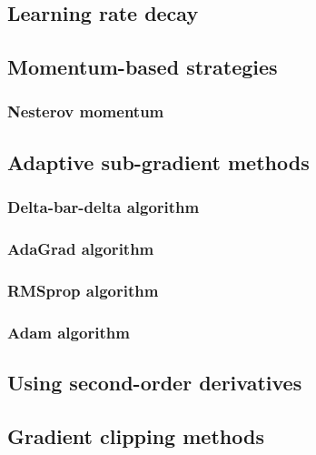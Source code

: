 \subsection{Learning rate decay}


\subsection{Momentum-based strategies}

\subsubsection{Nesterov momentum}


\subsection{Adaptive sub-gradient methods}

\subsubsection{Delta-bar-delta algorithm}

\subsubsection{AdaGrad algorithm}

\subsubsection{RMSprop algorithm}

\subsubsection{Adam algorithm}


\subsection{Using second-order derivatives}

\subsection{Gradient clipping methods}


